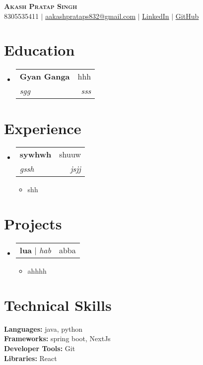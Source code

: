 \documentclass[letterpaper,11pt]{article}
\makeatletter
\newcommand{\resumeItem}[1]{
  \item\small{\small #1 \vspace{-2pt}}
}
\newcommand{\resumeProjectHeading}[2]{
  \item
    \begin{tabular*}{0.97\textwidth}[t]{l@{\extracolsep{\fill}}r}
      \small#1 & #2 \\
    \end{tabular*}\vspace{-7pt}
}
\newcommand{\resumeSubheading}[4]{
  \vspace{-2pt}\item
    \begin{tabular*}{0.97\textwidth}[t]{l@{\extracolsep{\fill}}r}
      \textbf{\small#1} & #2 \\
      \textit{\small#3} & \textit{\small #4} \\
    \end{tabular*}\vspace{-7pt}
}
\newcommand{\resumeSubHeadingListStart}{\begin{itemize}[leftmargin=0.15in, label={}]}
\newcommand{\resumeSubHeadingListEnd}{\end{itemize}}
\newcommand{\resumeItemListStart}{\begin{itemize}}
\newcommand{\resumeItemListEnd}{\end{itemize}\vspace{-5pt}}
\makeatother
\begin{document}
\begin{center}
    \textbf{\Huge \scshape Akash Pratap Singh} \\  \vspace{1pt}
    \small 8305535411 $|$ \href{mailto:aakashprataps832@gmail.com}{\underline{aakashprataps832@gmail.com}} $|$
    \href{https://www.linkedin.com/in/akashprataps/}{\underline{LinkedIn}} $|$
    \href{https://github.com/akashpratapsing}{\underline{GitHub}}
\end{center}

\section{Education}
\resumeSubHeadingListStart
  
    \resumeSubheading
      {Gyan Ganga }{hhh}
      {sgg}{sss}
  
\resumeSubHeadingListEnd


\section{Experience}
\resumeSubHeadingListStart
  
    \resumeSubheading
      {sywhwh}{shuuw}
      {gssh}{jsjj}
    \resumeItemListStart
      \resumeItem{shh}  
    \resumeItemListEnd
  
\resumeSubHeadingListEnd

\section{Projects}
\resumeSubHeadingListStart
  
    \resumeProjectHeading
      {\textbf{lua} $|$ \emph{hab}}{abba}
      \resumeItemListStart
        \resumeItem{ahhhh}  
      \resumeItemListEnd
  
\resumeSubHeadingListEnd



\section{Technical Skills}
\begin{itemize}[leftmargin=0.15in, label={}]
    \small{\item{
     \textbf{Languages:} java, python \\ 
     \textbf{Frameworks:} spring boot, NextJs \\ 
     \textbf{Developer Tools:} Git \\ 
     \textbf{Libraries:} React
    }}
\end{itemize}
\end{document}
